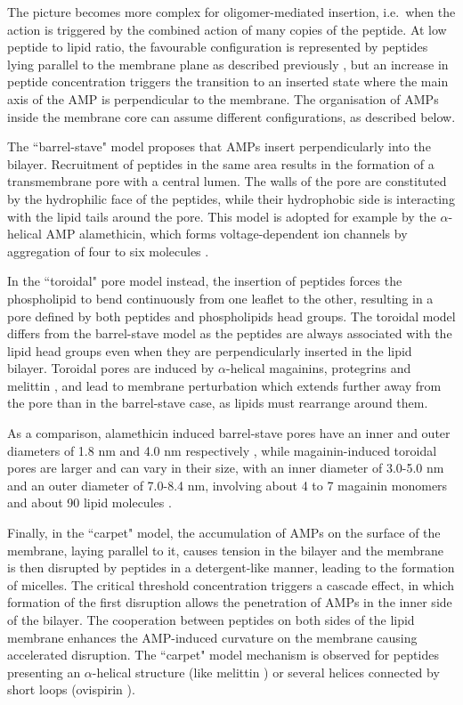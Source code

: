 The picture becomes more complex for oligomer-mediated insertion, i.e.\ when the action is triggered by the combined action of many copies of the peptide.
%
At low peptide to lipid ratio, the favourable configuration is represented by peptides lying parallel to the membrane plane as described previously \cite{Yang2001}, but an increase in peptide concentration triggers the transition to an inserted state where the main axis of the AMP is perpendicular to the membrane. The organisation of AMPs inside the membrane core can assume different configurations, as described below.

The ``barrel-stave" model proposes that AMPs insert perpendicularly into the bilayer. Recruitment of peptides in the same area results in the formation of a transmembrane pore with a central lumen. The walls of the pore are constituted by the hydrophilic face of the peptides, while their hydrophobic side is interacting with the lipid tails around the pore. This model is adopted for example by the $\alpha$-helical AMP alamethicin, which forms voltage-dependent ion channels by aggregation of four to six molecules \cite{Spaar2004}.

In the ``toroidal" pore model instead, the insertion of peptides forces the phospholipid to bend continuously from one leaflet to the other, resulting in a pore defined by both peptides and phospholipids head groups.
%
The toroidal model differs from the barrel-stave model as the peptides are always associated with the lipid head groups even when they are perpendicularly inserted in the lipid  bilayer. Toroidal pores are induced by $\alpha$-helical magainins, protegrins and melittin \cite{Yang2001,Matsuzaki1996,Hallock2003}, and lead to membrane perturbation which extends further away from the pore than in the barrel-stave case, as lipids must rearrange around them.

As a comparison, alamethicin induced barrel-stave pores have an inner and outer diameters of 1.8 nm and 4.0 nm respectively \cite{Spaar2004}, while magainin-induced toroidal pores are larger and can vary in their size, with an inner diameter of 3.0-5.0 nm and an outer diameter of 7.0-8.4 nm, involving about 4 to 7 magainin monomers and about 90 lipid molecules \cite{Matsuzaki1997}.

Finally, in the ``carpet" model, the accumulation of AMPs on the surface of the membrane, laying parallel to it, causes tension in the bilayer and the membrane is then disrupted by peptides in a detergent-like manner, leading to the formation of micelles.
%
The critical threshold concentration triggers a cascade effect, in which formation of the first disruption allows the penetration of AMPs in the inner side of the bilayer. The cooperation between peptides on both sides of the lipid membrane enhances the AMP-induced curvature on the membrane causing accelerated disruption.
%
The ``carpet" model mechanism is observed for peptides presenting an $\alpha$-helical structure (like melittin \cite{Ladokhin2001}) or several helices connected by short loops (ovispirin \cite{Yamaguchi2001}).

